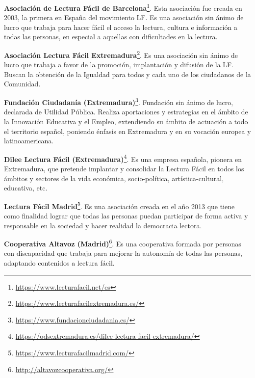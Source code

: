 \begin{itemize}
	\item{\textbf{Asociación de Lectura Fácil de Barcelona}\footnote{\href{https://www.lecturafacil.net/es}{{https://www.lecturafacil.net/es}}}. Esta asociación fue creada en 2003, la primera en España del movimiento LF. Es una asociación sin ánimo de lucro que trabaja para hacer fácil el acceso la lectura, cultura e información a todas las personas, en especial a aquellas con dificultades en la lectura. 
	
	\item{\textbf{Asociación Lectura Fácil Extremadura}\footnote{\href{https://www.lecturafacilextremadura.es/}{{https://www.lecturafacilextremadura.es/}}}. Es una asociación sin ánimo de lucro que trabaja a favor de la promoción, implantación y difusión de la LF. Buscan la obtención de la Igualdad para todos y cada uno de los ciudadanos de la Comunidad.
	
	\item{\textbf{Fundación Ciudadanía (Extremadura)}\footnote{\href{https://www.fundacionciudadania.es/}{https://www.fundacionciudadania.es/}}}. Fundación sin ánimo de lucro, declarada de Utilidad Pública. Realiza aportaciones y estrategias en el ámbito de la Innovación Educativa y el Empleo, extendiendo su ámbito de actuación a todo el territorio español, poniendo énfasis en Extremadura y en su vocación europea y latinoamericana.
	
	\item{\textbf{Dilee Lectura Fácil (Extremadura)}\footnote{\href{https://odsextremadura.es/dilee-lectura-facil-extremadura/}{https://odsextremadura.es/dilee-lectura-facil-extremadura/}}}. Es una empresa española, pionera en Extremadura, que pretende implantar y consolidar la Lectura Fácil en todos los ámbitos y sectores de la vida económica, socio-política, artística-cultural, educativa, etc.
	
	\item{\textbf{Lectura Fácil Madrid}\footnote{\href{https://www.lecturafacilmadrid.com/}{https://www.lecturafacilmadrid.com/}}}. Es una asociación creada en el año 2013 que tiene como finalidad  lograr que todas las personas puedan participar de forma activa y responsable en la sociedad y hacer realidad la democracia lectora. 
	
	\item{\textbf{Cooperativa Altavoz (Madrid)}\footnote{\href{http://altavozcooperativa.org/}{http://altavozcooperativa.org/}}}. Es una cooperativa formada por personas con discapacidad
	que trabaja para mejorar la autonomía de todas las personas, adaptando contenidos a lectura fácil.
	
}}
\end{itemize}
